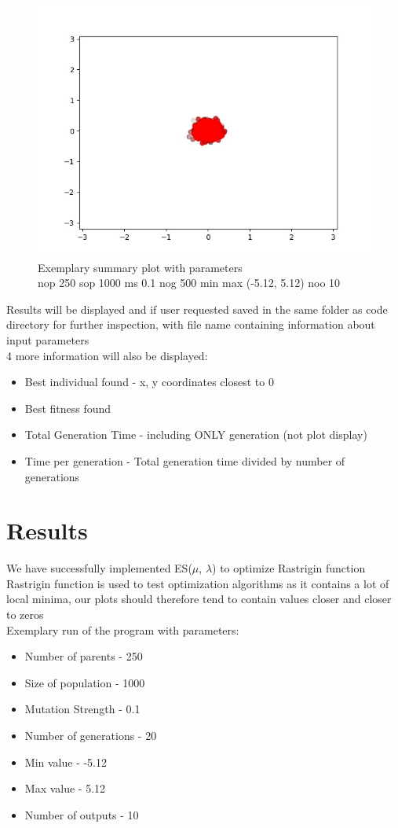 \documentclass{article}[12pt]
\begin{document}
\begin{figure}[H]
    \caption{Exemplary summary plot with parameters\\ nop 250 sop 1000 ms 0.1 nog 500 min max (-5.12, 5.12) noo 10 }
    \includegraphics[width=\textwidth]{example_summary.jpg}
    \centering
    \end{figure}
Results will be displayed and if user requested saved in the same folder as code directory for further inspection, with file name containing information about input parameters \\
4 more information will also be displayed: 
\begin{itemize}
    \item Best individual found - x, y coordinates closest to 0
    \item Best fitness found
    \item Total Generation Time - including ONLY generation (not plot display)
    \item Time per generation - Total generation time divided by number of generations
\end{itemize}
\section{Results}
We have successfully implemented ES($\mu$, $\lambda$) to optimize Rastrigin function \\ 
Rastrigin function is used to test optimization algorithms as it contains a lot of local minima, our plots should therefore tend to contain values closer and closer to zeros \\ 
Exemplary run of the program with parameters:
\begin{itemize}
    \item Number of parents - 250
    \item Size of population - 1000
    \item Mutation Strength - 0.1
    \item Number of generations - 20
    \item Min value - -5.12
    \item Max value - 5.12
    \item Number of outputs - 10
\end{itemize}
\end{document}

